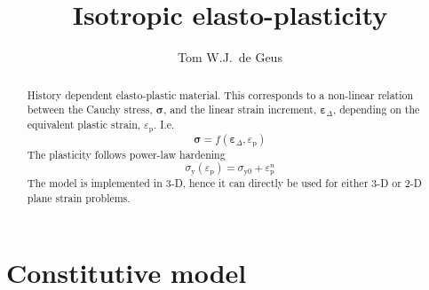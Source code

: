 \documentclass[namecite, fleqn]{goose-article}
\title{Isotropic elasto-plasticity}
\author{Tom W.J.\ de Geus}
\begin{document}
\maketitle

\begin{abstract}
\noindent
History dependent elasto-plastic material.
This corresponds to a non-linear relation between the Cauchy stress, $\bm{\sigma}$,
and the linear strain increment, $\bm{\varepsilon}_\Delta$,
depending on the equivalent plastic strain, $\varepsilon_\mathrm{p}$.
I.e.
\begin{equation*}
    \bm{\sigma}
    = f ( \bm{\varepsilon}_\Delta , \varepsilon_\mathrm{p} )
\end{equation*}
The plasticity follows power-law hardening
\begin{equation*}
    \sigma_\mathrm{y} (\varepsilon_\mathrm{p})
    = \sigma_\mathrm{y0} + \varepsilon_\mathrm{p}^n
\end{equation*}
The model is implemented in 3-D, hence it can directly be used for either 3-D
or 2-D plane strain problems.
\end{abstract}

\section{Constitutive model}
\end{document}
